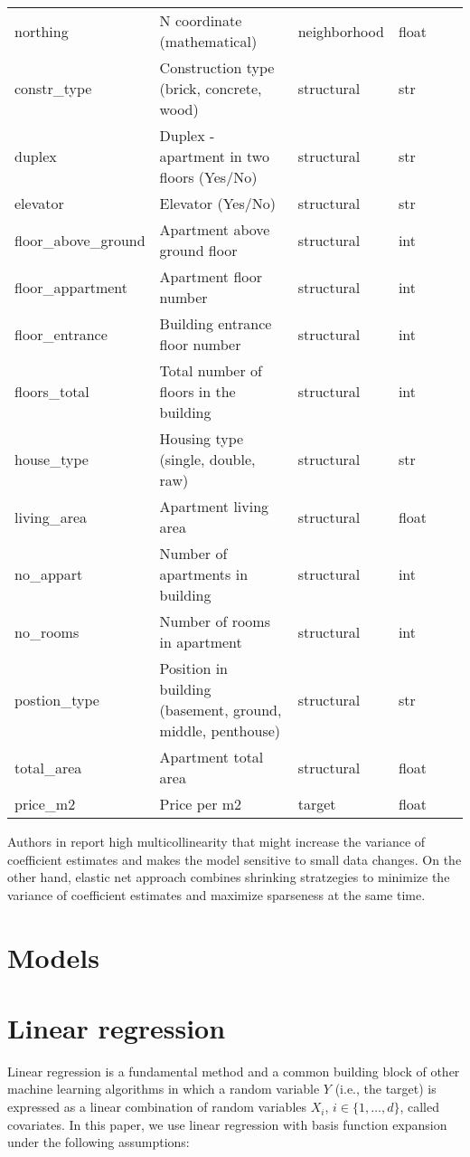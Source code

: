 \documentclass{article}
\begin{document}
\begin{table}[!ht]
\begin{longtable}{p{}p{}p{}p{}p{}p{}}
        northing & N coordinate (mathematical) & neighborhood & float \\
        constr\_type & Construction type (brick, concrete, wood) & structural & str \\
        duplex & Duplex - apartment in two floors (Yes/No) & structural & str \\
        elevator & Elevator (Yes/No) & structural & str \\
        floor\_above\_ground & Apartment above ground floor & structural & int \\
        floor\_appartment & Apartment floor number & structural & int \\
        floor\_entrance & Building entrance floor number & structural & int \\
        floors\_total & Total number of floors in the building & structural & int \\
        house\_type & Housing type (single, double, raw) & structural & str \\
        living\_area & Apartment living area & structural & float \\
        no\_appart & Number of apartments in building & structural & int \\
        no\_rooms & Number of rooms in apartment & structural & int \\
        postion\_type & Position in building (basement, ground, middle, penthouse) & structural & str \\
        total\_area & Apartment total area & structural & float \\
        price\_m2 & Price per m2 & target & float \\
       \bottomrule
     \end{longtable}
     \label{tab:table}
   \end{table}


   Authors in \cite{ceh_estimating_2018} report high multicollinearity that might increase the variance of coefficient estimates and makes the model sensitive to small data changes. On the other hand, elastic net approach combines shrinking stratzegies to minimize the variance of coefficient estimates and maximize sparseness at the same time.


\section{Models}

\section{Linear regression}
Linear regression is a fundamental method and a common building block of other machine learning algorithms in which a random variable $Y$ (i.e., the target) is expressed as a linear combination of random variables $X_i$, $i\in\{1,\ldots, d\}$, called covariates. In this paper, we use linear regression with basis function expansion under the following assumptions:
\end{document}
